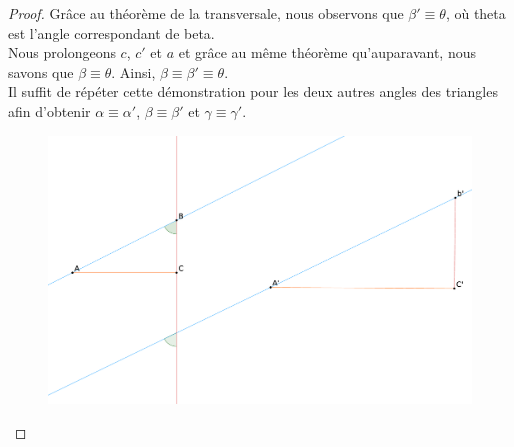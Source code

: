 \documentclass[a4paper,12pt]{article}
\begin{document}
\begin{proof}
Grâce au théorème de la transversale, nous observons que $\beta' \equiv \theta$, où theta est l'angle correspondant de beta.\\
Nous prolongeons $c$, $c'$ et $a$ et grâce au même théorème qu'auparavant, nous savons que $\beta \equiv \theta$.
Ainsi, $\beta \equiv \beta' \equiv \theta$.\\
Il suffit de répéter cette démonstration pour les deux autres angles des triangles afin d'obtenir $\alpha \equiv \alpha'$, $\beta \equiv \beta'$ et $\gamma \equiv \gamma'$.

\begin{figure}[H]
        \centering
        \includegraphics[scale=0.2]{semblable1.3.eps}
    \end{figure}

\end{proof}
\end{document}

